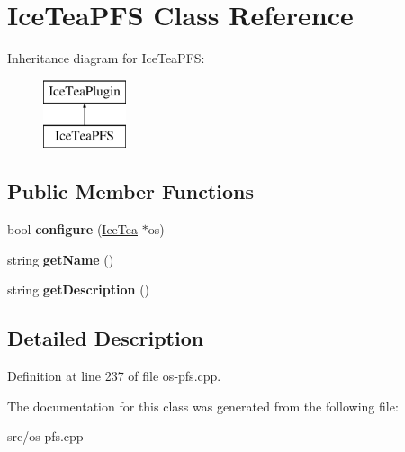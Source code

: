 \hypertarget{class_ice_tea_p_f_s}{}\section{Ice\+Tea\+P\+FS Class Reference}
\label{class_ice_tea_p_f_s}
Inheritance diagram for Ice\+Tea\+P\+FS\+:\begin{figure}[H]
\begin{center}
\leavevmode
\includegraphics[height=2.000000cm]{class_ice_tea_p_f_s}
\end{center}
\end{figure}
\subsection*{Public Member Functions}
\begin{DoxyCompactItemize}
\item 
bool {\bfseries configure} (\hyperlink{class_ice_tea}{Ice\+Tea} $\ast$os)\hypertarget{class_ice_tea_p_f_s_a9c4805ec1110ba31cd12229ec33c12d7}{}\label{class_ice_tea_p_f_s_a9c4805ec1110ba31cd12229ec33c12d7}

\item 
string {\bfseries get\+Name} ()\hypertarget{class_ice_tea_p_f_s_adca9db8574da31bd370161719144b85c}{}\label{class_ice_tea_p_f_s_adca9db8574da31bd370161719144b85c}

\item 
string {\bfseries get\+Description} ()\hypertarget{class_ice_tea_p_f_s_a52673965993df763e8e2794111bc2dc9}{}\label{class_ice_tea_p_f_s_a52673965993df763e8e2794111bc2dc9}

\end{DoxyCompactItemize}


\subsection{Detailed Description}


Definition at line 237 of file os-\/pfs.\+cpp.



The documentation for this class was generated from the following file\+:\begin{DoxyCompactItemize}
\item 
src/os-\/pfs.\+cpp\end{DoxyCompactItemize}
